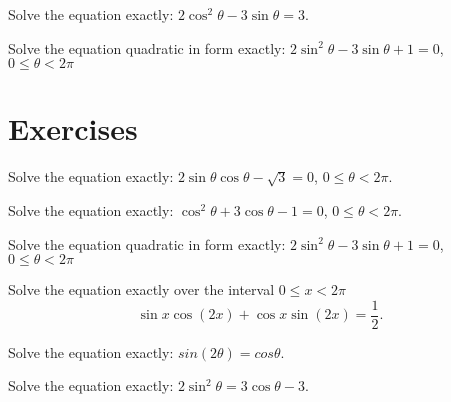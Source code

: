 \newpage

\begin{example}
  Solve the equation exactly: $2\cos^2\theta-3\sin\theta=3$.
\end{example}

\begin{example}
  Solve the equation quadratic in form exactly: $2 {\sin}^2 \theta-3 \sin \theta+1=0$, $0\le\theta<2\pi$
\end{example}

\newpage
\section*{Exercises}

\begin{exercise}
  Solve the equation exactly: $2\sin \theta\cos\theta-\sqrt{3}=0$, $0\le \theta<2\pi$.
\end{exercise}

\begin{exercise}
  Solve the equation exactly: $\cos^2\theta+3 \cos \theta-1=0$, $0\le \theta<2\pi$.
\end{exercise}

\begin{exercise}
  Solve the equation quadratic in form exactly: $2 {\sin}^2 \theta-3 \sin \theta+1=0$, $0\le\theta<2\pi$
\end{exercise}

\newpage

\begin{exercise}
  Solve the equation exactly over the interval $0\le x<2\pi$
\[\sin x \cos(2x)+\cos x \sin(2x)=\dfrac{1}{2}.\]
\end{exercise}

\begin{exercise}
  Solve the equation exactly: $sin(2\theta)=cos\theta$.
\end{exercise}

\begin{exercise}
  Solve the equation exactly: $2\sin^2\theta=3\cos\theta-3$.
\end{exercise}
